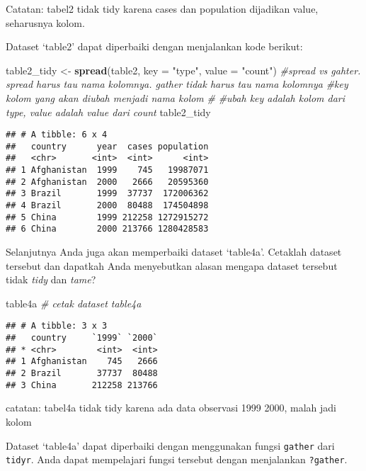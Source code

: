 \documentclass[]{article}
\newenvironment{Shaded}{\begin{snugshade}}{\end{snugshade}}
\newcommand{\CommentTok}[1]{\textcolor[rgb]{0.56,0.35,0.01}{\textit{#1}}}
\newcommand{\DataTypeTok}[1]{\textcolor[rgb]{0.13,0.29,0.53}{#1}}
\newcommand{\KeywordTok}[1]{\textcolor[rgb]{0.13,0.29,0.53}{\textbf{#1}}}
\newcommand{\NormalTok}[1]{#1}
\newcommand{\StringTok}[1]{\textcolor[rgb]{0.31,0.60,0.02}{#1}}
\begin{document}
Catatan: tabel2 tidak tidy karena cases dan population dijadikan value,
seharusnya kolom.

Dataset `table2' dapat diperbaiki dengan menjalankan kode berikut:

\begin{Shaded}
\begin{Highlighting}[]
\NormalTok{table2_tidy <-}\StringTok{ }\KeywordTok{spread}\NormalTok{(table2, }\DataTypeTok{key =} \StringTok{"type"}\NormalTok{, }\DataTypeTok{value =} \StringTok{"count"}\NormalTok{)}
\CommentTok{#spread vs gahter. spread harus tau nama kolomnya. gather tidak harus tau nama kolomnya}
\CommentTok{#key kolom yang akan diubah menjadi nama kolom}
\CommentTok{#}
\CommentTok{#ubah key adalah kolom dari type, value adalah value dari count}
\NormalTok{table2_tidy}
\end{Highlighting}
\end{Shaded}

\begin{verbatim}
## # A tibble: 6 x 4
##   country      year  cases population
##   <chr>       <int>  <int>      <int>
## 1 Afghanistan  1999    745   19987071
## 2 Afghanistan  2000   2666   20595360
## 3 Brazil       1999  37737  172006362
## 4 Brazil       2000  80488  174504898
## 5 China        1999 212258 1272915272
## 6 China        2000 213766 1280428583
\end{verbatim}

Selanjutnya Anda juga akan memperbaiki dataset `table4a'. Cetaklah
dataset tersebut dan dapatkah Anda menyebutkan alasan mengapa dataset
tersebut tidak \emph{tidy} dan \emph{tame}?

\begin{Shaded}
\begin{Highlighting}[]
\NormalTok{table4a }\CommentTok{# cetak dataset table4a}
\end{Highlighting}
\end{Shaded}

\begin{verbatim}
## # A tibble: 3 x 3
##   country     `1999` `2000`
## * <chr>        <int>  <int>
## 1 Afghanistan    745   2666
## 2 Brazil       37737  80488
## 3 China       212258 213766
\end{verbatim}

catatan: tabel4a tidak tidy karena ada data observasi 1999 2000, malah
jadi kolom

Dataset `table4a' dapat diperbaiki dengan menggunakan fungsi
\texttt{gather} dari \texttt{tidyr}. Anda dapat mempelajari fungsi
tersebut dengan menjalankan \texttt{?gather}.
\end{document}
